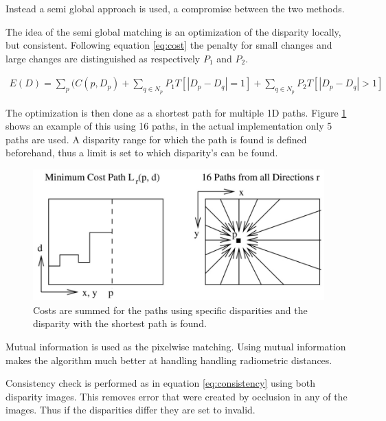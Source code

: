 Instead a semi global approach is used, a compromise between the two methods. 

The idea of the semi global matching is an optimization of the disparity locally, but consistent. Following equation \ref{eq:cost} the penalty for small changes and large changes are distinguished as respectively $P_{1}$ and $P_{2}$.

\begin{equation}\label{eq:cost}
\begin{split}
E(D) = \sum\limits_{p}(C(p,D_{p}) + \sum\limits_{q \in N_{p} } P_{1} T [|D_{p} - D_{q}| = 1] + \sum\limits_{q \in N_{p} } P_{2} T [|D_{p} - D_{q}| > 1]
\end{split}
\end{equation} 

The optimization is then done as a shortest path for multiple 1D paths. Figure \ref{fig:paths} shows an example of this using 16 paths, in the actual implementation only 5 paths are used. A disparity range for which the path is found is defined beforehand, thus a limit is set to which disparity’s can be found. 

\begin{figure}[h!]
  \centering
    \includegraphics[width=\textwidth]{graphics/06_vision/cost_aggregation.jpg}
      \caption{Costs are summed for the paths using specific disparities and the disparity with the shortest path is found.}
    \label{fig:paths}
\end{figure}

Mutual information \cite{egnal2000mutual} is used as the pixelwise matching. Using mutual information makes the algorithm much better at handling handling radiometric distances. 



Consistency check is performed as in equation \ref{eq:consistency} using both disparity images. This removes error that were created by occlusion in any of the images. Thus if the disparities differ they are set to invalid. 

